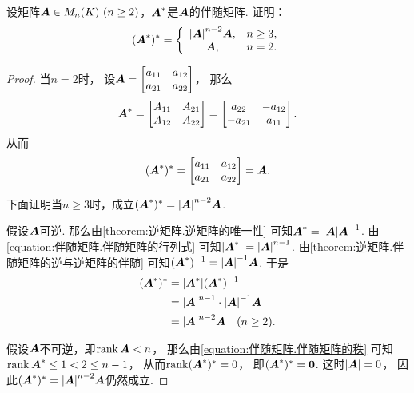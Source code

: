 \begin{example}
设矩阵\(\vb{A} \in M_n(K)\ (n\geq2)\)，\(\boldsymbol{A}^*\)是\(\boldsymbol{A}\)的伴随矩阵.
证明：\begin{equation}\label{equation:伴随矩阵.伴随矩阵的伴随}
	(\boldsymbol{A}^*)^* = \left\{ \begin{array}{cl}
		\abs{\boldsymbol{A}}^{n-2} \boldsymbol{A}, & n\geq3, \\
		\boldsymbol{A}, & n=2.
	\end{array} \right.
\end{equation}
\begin{proof}
当\(n=2\)时，
设\(\boldsymbol{A} = \begin{bmatrix}
	a_{11} & a_{12} \\
	a_{21} & a_{22}
\end{bmatrix}\)，
那么\begin{equation*}
	\boldsymbol{A}^* = \begin{bmatrix}
		A_{11} & A_{21} \\
		A_{12} & A_{22}
	\end{bmatrix}
	= \begin{bmatrix}
		a_{22} & - a_{12} \\
		- a_{21} & a_{11}
	\end{bmatrix}.
\end{equation*}
从而\begin{equation*}
	(\boldsymbol{A}^*)^* = \begin{bmatrix}
		a_{11} & a_{12} \\
		a_{21} & a_{22}
	\end{bmatrix}
	= \boldsymbol{A}.
\end{equation*}

下面证明当\(n\geq3\)时，成立\((\boldsymbol{A}^*)^* = \abs{\boldsymbol{A}}^{n-2} \boldsymbol{A}\).

假设\(\boldsymbol{A}\)可逆.
那么由\cref{theorem:逆矩阵.逆矩阵的唯一性}
可知\(\boldsymbol{A}^* = \abs{\boldsymbol{A}} \boldsymbol{A}^{-1}\).
由\cref{equation:伴随矩阵.伴随矩阵的行列式}
可知\(\abs{\boldsymbol{A}^*} = \abs{\boldsymbol{A}}^{n-1}\).
由\cref{theorem:逆矩阵.伴随矩阵的逆与逆矩阵的伴随}
可知\((\boldsymbol{A}^*)^{-1} = \abs{\boldsymbol{A}}^{-1} \boldsymbol{A}\).
于是\begin{align*}
	(\boldsymbol{A}^*)^*
	&= \abs{\boldsymbol{A}^*} (\boldsymbol{A}^*)^{-1} \\
	&= \abs{\boldsymbol{A}}^{n-1} \cdot \abs{\boldsymbol{A}}^{-1} \boldsymbol{A} \\
	&= \abs{\boldsymbol{A}}^{n-2} \boldsymbol{A}
	\quad(n\geq2).
\end{align*}

假设\(\boldsymbol{A}\)不可逆，即\(\rank\boldsymbol{A}<n\)，
那么由\cref{equation:伴随矩阵.伴随矩阵的秩}
可知\(\rank\boldsymbol{A}^* \leq 1 < 2 \leq n-1\)，
从而\(\rank(\boldsymbol{A}^*)^* = 0\)，
即\((\boldsymbol{A}^*)^* = \boldsymbol0\).
这时\(\abs{\boldsymbol{A}}=0\)，
因此\((\boldsymbol{A}^*)^* = \abs{\boldsymbol{A}}^{n-2} \boldsymbol{A}\)仍然成立.
\end{proof}
\end{example}

